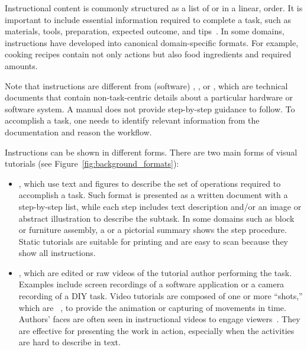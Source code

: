 Instructional content is commonly structured as a list of  or  in a linear,  order.
%
It is important to include essential information required to complete a task, such as materials, tools, preparation, expected outcome, and tips~\cite{Torrey:2007he}.
%
In some domains, instructions have developed into canonical domain-specific formats. For example, cooking recipes contain not only actions but also food ingredients and required amounts.

Note that instructions are different from (software) , , or , which are technical documents that contain non-task-centric details about a particular hardware or software system. A manual does not provide step-by-step guidance to follow. To accomplish a task, one needs to identify relevant information from the documentation and reason the workflow.


Instructions can be shown in different forms. There are two main forms of visual tutorials (see Figure~\ref{fig:background_formats}):
\begin{itemize}
  \item {}, which use text and figures to describe the set of operations required to accomplish a task. Such format is presented as a written document with a step-by-step list, while each step includes text description and/or an image or abstract illustration to describe the subtask. In some domains such as block or furniture assembly, a  or a pictorial summary shows the step procedure. Static tutorials are suitable for printing and are easy to scan because they show all instructions.
  \item {}, which are edited or raw videos of the tutorial author performing the task. Examples include screen recordings of a software application or a camera recording of a DIY task.
  Video tutorials are composed of one or more ``shots,'' which are ~\cite{Goldman:2007:FVA:1354647}, to provide the animation or capturing of movements in time. Authors' faces are often seen in instructional videos to engage viewers~\cite{Kizilcec:2014:SFV:2556288.2557207}.
  They are effective for presenting the work in action, especially when the activities are hard to describe in text.
\end{itemize}

